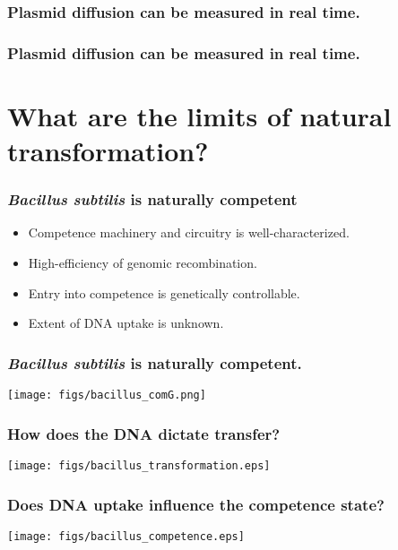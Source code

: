 \begin{frame}
	\frametitle{Plasmid diffusion can be measured in real time.}
\end{frame}	

\begin{frame}
	\frametitle{Plasmid diffusion can be measured in real time.}
\end{frame}	

\section{What are the limits of natural transformation?}
\begin{frame}
	\frametitle{\emph{Bacillus subtilis} is naturally competent}
	\begin{itemize}
		\item Competence machinery and circuitry is well-characterized.\\
		\item High-efficiency of genomic recombination.\\
		\item Entry into competence is \alert{genetically controllable.}\\
		\item Extent of DNA uptake is unknown.	\\
	\end{itemize}

\end{frame}

\begin{frame}
	\frametitle{\emph{Bacillus subtilis} is naturally competent.}
	\centerline{\texttt{[image: figs/bacillus\_comG.png]}}
\end{frame}
\begin{frame}
	\frametitle{How does the DNA dictate transfer?}
	\centerline{\texttt{[image: figs/bacillus\_transformation.eps]}}
\end{frame}

\begin{frame}
	\frametitle{Does DNA uptake influence the competence state?}
	\centerline{\texttt{[image: figs/bacillus\_competence.eps]}}
\end{frame}

